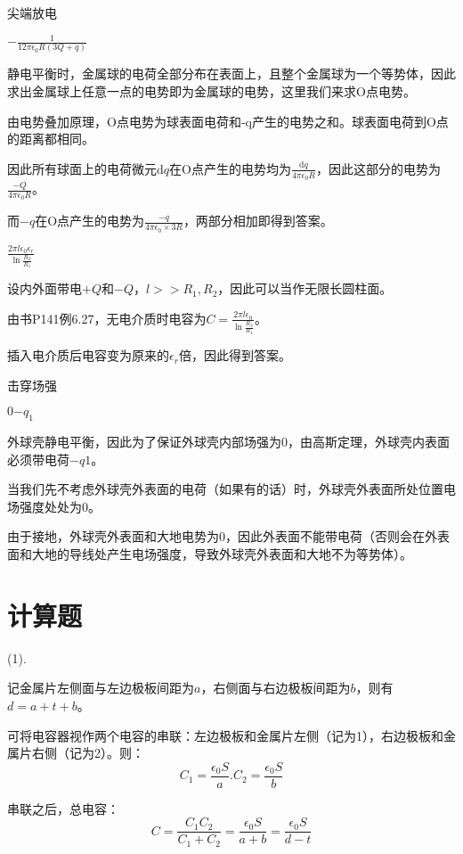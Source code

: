 \documentclass[b5paper,opensource]{qyxf-book}
\newcommand{\di}[1]{\mathrm{d}#1}
\begin{document}
 尖端放电

 $ -\frac{1}{12\pi\epsilon_0 R(3Q+q)} $

\solve 静电平衡时，金属球的电荷全部分布在表面上，且整个金属球为一个等势体，因此求出金属球上任意一点的电势即为金属球的电势，这里我们来求O点电势。

由电势叠加原理，O点电势为球表面电荷和-q产生的电势之和。球表面电荷到O点的距离都相同。

因此所有球面上的电荷微元$\di{q}$在O点产生的电势均为$\frac{\di{q}}{4\pi\epsilon_0 R}$，因此这部分的电势为$\frac{-Q}{4\pi\epsilon_0 R}$。

而$ -q $在O点产生的电势为$\frac{-q}{4\pi\epsilon_0 \times 3R}$，两部分相加即得到答案。

 $\frac{2\pi l\epsilon_0\epsilon_r}{\ln \frac{R_2}{R_1}}$

\solve 设内外面带电$ +Q $和$ -Q $，$ l>>R_1,R_2 $，因此可以当作无限长圆柱面。

由书P141例6.27，无电介质时电容为$ C=\frac{2\pi l\epsilon_0}{\ln \frac{R_2}{R_1}} $。

插入电介质后电容变为原来的$ \epsilon_r $倍，因此得到答案。

 击穿场强

 $ 0 $\quad$ -q_1 $

\solve 外球壳静电平衡，因此为了保证外球壳内部场强为0，由高斯定理，外球壳内表面必须带电荷$ -q1 $。

当我们先不考虑外球壳外表面的电荷（如果有的话）时，外球壳外表面所处位置电场强度处处为0。

由于接地，外球壳外表面和大地电势为0，因此外表面不能带电荷（否则会在外表面和大地的导线处产生电场强度，导致外球壳外表面和大地不为等势体）。

\section{计算题}


\solve 

(1).

记金属片左侧面与左边极板间距为$ a $，右侧面与右边极板间距为$ b $，则有$ d=a+t+b $。

可将电容器视作两个电容的串联：左边极板和金属片左侧（记为1），右边极板和金属片右侧（记为2）。则：
\[C_1=\frac{\epsilon_0 S}{a}.C_2=\frac{\epsilon_0 S}{b}\]

串联之后，总电容：
\[C=\frac{C_1C_2}{C_1+C_2}=\frac{\epsilon_0 S}{a+b}=\frac{\epsilon_0 S}{d-t}\]
\end{document}
